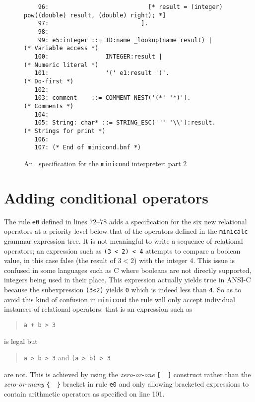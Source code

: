 \begin{figure}
\begin{minipage}{30cm}
\begin{verbatim}
    96:                            [* result = (integer) pow((double) result, (double) right); *] 
    97:                          ].
    98: 
    99: e5:integer ::= ID:name _lookup(name result) |                    (* Variable access *)
   100:                INTEGER:result |                                  (* Numeric literal *)
   101:                '(' e1:result ')'.                                (* Do-first *)
   102: 
   103: comment    ::= COMMENT_NEST('(*' '*)').                          (* Comments *)
   104: 
   105: String: char* ::= STRING_ESC('"' '\\'):result.                   (* Strings for print *)
   106: 
   107: (* End of minicond.bnf *)
\end{verbatim}
\end{minipage}
\caption{An \rdp\ specification for the {\tt minicond} interpreter: part 2}
\label{minicond:interp2}
\end{figure}

\section{Adding conditional operators}

The rule {\tt e0} defined in lines 72--78 adds a specification for the
six new  relational operators at a priority level below that of the
operators defined in the {\tt minicalc} grammar expression tree.
It is not meaningful to write a sequence of relational operators;
an expression such as \verb|(3 < 2) < 4| attempts to compare a boolean value,
in this case {\sc false} (the result of $3<2$) with the integer 4.
This issue is
confused in some languages such as C where booleans are not directly
supported, integers being used in their place. This expression actually
yields {\sc true} in ANSI-C because the subexpression \verb+(3<2)+
yields {\tt 0} which is indeed less than {\tt 4}. So as to avoid this kind of
confusion in {\tt minicond} the rule will only accept individual instances of
relational operators: that is an expression such as
\begin{quote}
\verb|a + b > 3|
\end{quote}
is legal but 
\begin{quote}
\verb|a > b > 3| and \verb|(a > b) > 3|
\end{quote}
are not.
This is achieved by using the {\em zero-or-one} \verb+[  ]+ construct rather than
the {\em zero-or-many} \verb+{  }+ bracket in rule {\tt e0} and only allowing bracketed
expressions to contain arithmetic operators as specified on line 101.


